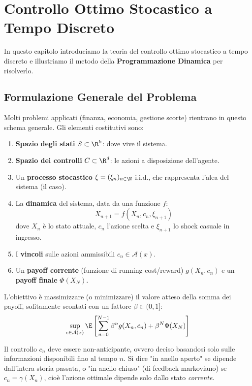 
\chapter{Controllo Ottimo Stocastico a Tempo Discreto}

In questo capitolo introduciamo la teoria del controllo ottimo stocastico a tempo discreto e illustriamo il metodo della \textbf{Programmazione Dinamica} per risolverlo.

\section{Formulazione Generale del Problema}

Molti problemi applicati (finanza, economia, gestione scorte) rientrano in questo schema generale.
Gli elementi costitutivi sono:
\begin{enumerate}
    \item \textbf{Spazio degli stati} $S \subset \R^k$: dove vive il sistema.
    \item \textbf{Spazio dei controlli} $C \subset \R^d$: le azioni a disposizione dell'agente.
    \item Un \textbf{processo stocastico} $\xi = (\xi_n)_{n \in \N}$ i.i.d., che rappresenta l'alea del sistema (il caso).
    \item La \textbf{dinamica} del sistema, data da una funzione $f$:
    \[ X_{n+1} = f(X_n, c_n, \xi_{n+1}) \]
    dove $X_n$ è lo stato attuale, $c_n$ l'azione scelta e $\xi_{n+1}$ lo shock casuale in ingresso.
    \item I \textbf{vincoli} sulle azioni ammissibili $c_n \in \mathcal{A}(x)$.
    \item Un \textbf{payoff corrente} (funzione di running cost/reward) $g(X_n, c_n)$ e un \textbf{payoff finale} $\Phi(X_N)$.
\end{enumerate}

L'obiettivo è massimizzare (o minimizzare) il valore atteso della somma dei payoff, solitamente scontati con un fattore $\beta \in (0, 1]$:
\[ \sup_{c \in \mathcal{A}(x)} \E \left[ \sum_{n=0}^{N-1} \beta^n g(X_n, c_n) + \beta^N \Phi(X_N) \right] \]

\begin{spiegazione}
Il controllo $c_n$ deve essere non-anticipante, ovvero deciso basandosi solo sulle informazioni disponibili fino al tempo $n$. 
Si dice "in anello aperto" se dipende dall'intera storia passata, o "in anello chiuso" (di feedback markoviano) se $c_n = \gamma(X_n)$, cioè l'azione ottimale dipende solo dallo stato \emph{corrente}.
\end{spiegazione}

